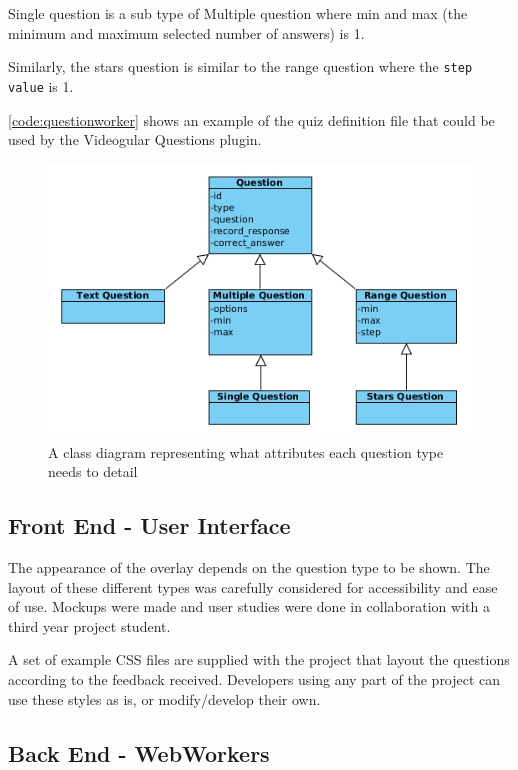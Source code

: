 Single question is a sub type of Multiple question where min and max (the minimum and maximum selected number of answers) is 1.

Similarly, the stars question is similar to the range question where the \lstinline|step value| is 1.

\autoref{code:questionworker} shows an example of the quiz definition file that could be used by the Videogular Questions plugin.

\begin{figure}
\centering
\includegraphics[width=12cm]{../figures/questions_class_diagram.png}
\caption{A class diagram representing what attributes each question type needs to detail}
\label{Figure:questions_class_diagram}
\end{figure}

\subsection{Front End - User Interface}

The appearance of the overlay depends on the question type to be shown. The layout of these different types was carefully considered for accessibility and ease of use. Mockups were made and user studies were done in collaboration with a third year project student.

A set of example \gls{CSS} files are supplied with the project that layout the questions according to the feedback received. Developers using any part of the project can use these styles as is, or modify/develop their own.

\subsection{Back End - WebWorkers}
\label{Subsection:WebWorkers}

